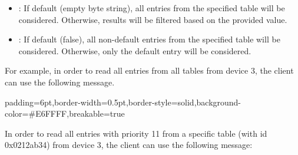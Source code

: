 \documentclass[11pt]{article}
\begin{document}
{\begin{itemize}[noitemsep,topsep=\mdcompacttopsep]
\item{}: If default (empty byte string), all entries from the specified
table will be considered. Otherwise, results will be filtered based on the
provided  value.%

\item{}: If default (false), all non-default entries from the
specified table will be considered. Otherwise, only the default entry will be
considered.%
\end{itemize}%

\noindent{}For example, in order to read all entries from all tables from device 3, the
client can use the following  message.%

\begin{mdbmargintb}{6pt}{6pt}%
\begin{mdblock}{padding=6pt,border-width=0.5pt,border-style=solid,background-color=\#E6FFFF,breakable=true}%
\begin{mdpre}%
\end{mdpre}%
\end{mdblock}%
\end{mdbmargintb}%

\noindent{}In order to read all entries with priority 11 from a specific table (with id
0x0212ab34) from device 3, the client can use the following 
message:%

}
\end{document}
